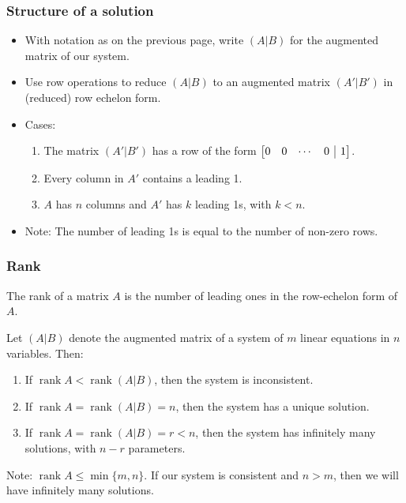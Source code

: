 \documentclass[12pt,t]{beamer}
\makeatletter
\newenvironment{amatrix}[1]{%
  \left[\begin{array}{@{}*{#1}{c}|c@{}}
}{%
  \end{array}\right]
}
\DeclareMathOperator{\rank}{rank}
\makeatother
\begin{document}
\begin{frame}\frametitle{Structure of a solution}
\begin{itemize}
 \item  With notation as on the previous page, write $(A|B)$ for the augmented matrix of our system.
 \item Use row operations to reduce $(A|B)$ to an augmented matrix $(A'|B')$ in (reduced) row echelon form.
 \item Cases:
\begin{enumerate}
 \item The matrix $(A'|B')$ has a row of the form $\begin{amatrix}{4}0&0&\cdots &0&1\end{amatrix}$.

\bigskip

 \item Every column in $A'$ contains a leading 1.

\bigskip

 \item $A$ has $n$ columns and $A'$ has $k$ leading 1s, with $k<n$.                                                                                 
\end{enumerate}

\bigskip

\bigskip 

\item Note: The number of leading 1s is equal to the number of non-zero rows.
\end{itemize}
\end{frame}
\begin{frame}\frametitle{Rank}
 \begin{definition}
 The \alert{rank} of a matrix $A$ is the number of leading ones in the row-echelon form of $A$.
 \end{definition}
 \begin{theorem}
 Let $(A|B)$ denote the augmented matrix of a system of $m$ linear equations in $n$ variables. Then:
 \begin{enumerate}
 \item If $\rank A <\rank (A|B)$, then the system is inconsistent.
 \item If $\rank A = \rank(A|B) = n$, then the system has a unique solution.
 \item If $\rank A =\rank(A|B)= r<n$, then the system has infinitely many solutions, with $n-r$ parameters.
 \end{enumerate}
 \end{theorem}
 Note: $\rank A\leq \min\{m,n\}$. If our system is consistent and $n>m$, then we will have infinitely many solutions.
\end{frame}
\end{document}
